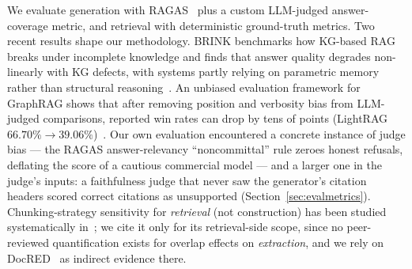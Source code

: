 We evaluate generation with RAGAS~\cite{es2023ragas} plus a custom
LLM-judged answer-coverage metric, and retrieval with deterministic
ground-truth metrics. Two recent results shape our methodology. BRINK
benchmarks how KG-based RAG breaks under incomplete knowledge and finds
that answer quality degrades non-linearly with KG defects, with systems
partly relying on parametric memory rather than structural
reasoning~\cite{zhou2025brink}. An unbiased evaluation framework for
GraphRAG shows that after removing position and verbosity bias from
LLM-judged comparisons, reported win rates can drop by tens of points
(\eg LightRAG $66.70\%\!\rightarrow\!39.06\%$)~\cite{zeng2025unbiased}. Our
own evaluation encountered a concrete instance of judge bias --- the RAGAS
answer-relevancy ``noncommittal'' rule zeroes honest refusals, deflating
the score of a cautious commercial model --- and a larger one in the
judge's inputs: a faithfulness judge that never saw the generator's
citation headers scored correct citations as unsupported
(Section~\ref{sec:evalmetrics}).
Chunking-strategy sensitivity for \emph{retrieval} (not construction) has
been studied systematically in~\cite{shaukat2026chunking}; we cite it only
for its retrieval-side scope, since no peer-reviewed quantification exists
for overlap effects on \emph{extraction}, and we rely on
DocRED~\cite{yao2019docred} as indirect evidence there.
